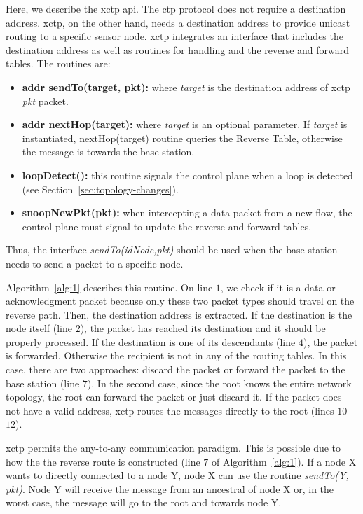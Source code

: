 Here, we describe the \ac{xctp} \ac{api}. The \ac{ctp} protocol does not require a destination address. \ac{xctp}, on the other hand, needs a destination address to provide unicast routing to a specific sensor node. \ac{xctp} integrates an interface that includes the destination address as well as routines for handling and the reverse and forward tables. The routines are:

\begin{itemize}
    \item \textbf{addr sendTo(target, pkt):} where \textit{target} is the destination address of \ac{xctp} \textit{pkt} packet.
    \item \textbf{addr nextHop(target):} where \textit{target} is an optional parameter. If \textit{target} is instantiated, nextHop(target) routine queries the Reverse Table, otherwise the message is towards the base station.
     \item \textbf{loopDetect():} this routine signals the control plane when a loop is detected (see Section~\ref{sec:topology-changes}).
     \item \textbf{snoopNewPkt(pkt):} when intercepting a data packet from a new flow, the control plane must signal to update the reverse and forward tables.
\end{itemize}

Thus, the interface \textit{sendTo(idNode,pkt)} should be used when the base station needs to send a packet to a specific node.

Algorithm~\ref{alg:1} describes this routine. On line $1$, we check if it is a data or acknowledgment packet because only these two packet types should travel on the reverse path. Then, the destination address is extracted. If the destination is the node itself (line $2$), the packet has reached its destination and it should be properly processed. If the destination is one of its descendants (line $4$), the packet is forwarded. Otherwise the recipient is not in any of the routing tables. In this case, there are two approaches: discard the packet or forward the packet to the base station (line $7$). In the second case, since the root knows the entire network topology, the root can forward the packet or just discard it. If the packet does not have a valid address, \ac{xctp} routes the messages directly to the root (lines $10$-$12$).

\ac{xctp} permits the any-to-any communication paradigm. This is possible due to how the the reverse route is constructed (line $7$ of Algorithm~\ref{alg:1}). If a node X wants to directly connected to a node Y, node X can use the routine \textit{sendTo(Y, pkt)}. Node Y will receive the message from an ancestral of node X or, in the worst case, the message will go to the root and towards node Y.

